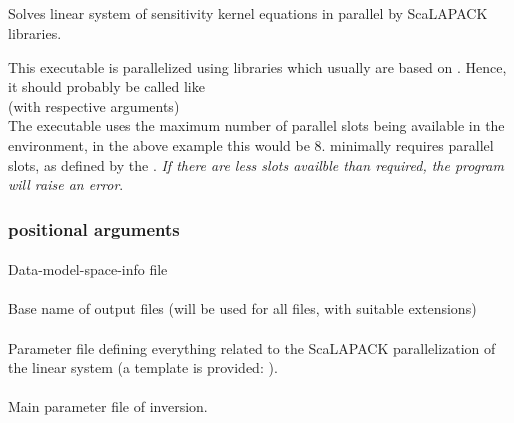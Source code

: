 \subsection{} \label{programs_scripts,sec:bin_prog,sec:solve_par_kernel_sys}
Solves linear system of sensitivity kernel equations in parallel by ScaLAPACK libraries.

This executable is parallelized using  libraries which usually are based on . 
Hence, it should probably be called like\\
 (with respective arguments)\\
The executable uses the maximum number of parallel slots being available in the  environment, in 
the above example this would be 8.  minimally requires  parallel
slots, as defined by the . \emph{If there are less slots availble than required, the program will 
raise an error}.
\subsubsection{positional arguments}
\paragraph{}
Data-model-space-info file
\paragraph{}
Base name of output files (will be used for all files, with suitable extensions)
\paragraph{}
Parameter file defining everything related to the ScaLAPACK parallelization of the linear system
(a template is provided: ).
\paragraph{}
Main parameter file of inversion.
